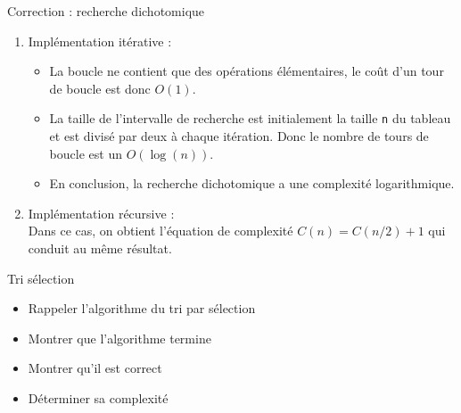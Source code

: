 \documentclass[10pt]{beamer}
\begin{document}
\begin{frame}[fragile]{\Ctitle}{\stitle}
	\begin{exampleblock}{Correction : recherche dichotomique}
		\begin{enumerate}
			\item Implémentation itérative :
			      \begin{itemize}
				      \item<2->\textcolor{OliveGreen}{La boucle ne contient que des opérations élémentaires, le coût d'un tour de boucle est donc $O(1)$.}
				      \item<3->\textcolor{OliveGreen}{La taille de l'intervalle de recherche est initialement la taille {\tt n} du tableau et est divisé par deux à chaque itération. Donc le nombre de tours de boucle est un $O(\log(n))$.}
				      \item<4->\textcolor{OliveGreen}{En conclusion, la recherche dichotomique a une complexité logarithmique.}
			      \end{itemize}
			\item<5-> Implémentation récursive :\\
				\textcolor{OliveGreen}{Dans ce cas, on obtient l'équation de complexité $C(n) = C(n/2) + 1$} qui conduit au même résultat.
		\end{enumerate}
	\end{exampleblock}
\end{frame}


\begin{frame}[fragile]{\Ctitle}{\stitle}
	\begin{exampleblock}{Tri sélection}
		\begin{itemize}
			\item<1-> Rappeler l'algorithme du tri par sélection \\
				\onslide<2->{\textcolor{OliveGreen}{On note $n$ la taille du tableau, pour chaque entier $i=0 \dots n-1$, on échange l'élément situé à l'indice $i$ avec le minimum du tableau depuis l'indice $i$.}}
			\item<3-> Montrer que l'algorithme termine\\
				\onslide<4->{\textcolor{OliveGreen}{L'algorithme ne contient pas de boucle non bornées donc sa terminaison est garantie.}}
			\item<5-> Montrer qu'il est correct
			\item<6-> Déterminer sa complexité
		\end{itemize}
	\end{exampleblock}
\end{frame}
\end{document}
